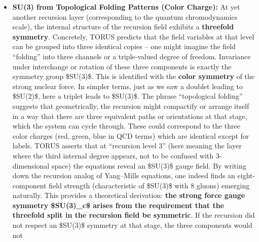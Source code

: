 \documentclass[]{article}
\begin{document}
\begin{itemize}
{  \$U(1)}\{\textbackslash{}text\{em\}\}\$ (electromagnetism), yielding
  three massive gauge bosons (\$W\^{}+, W\^{}-, Z\^{}0\$) and one
  massless photon, exactly as in the electroweak theory​. All of these
  details (like the values of coupling constants and the mixing angle)
  emerge from the recursion structure -- for example, the ratio of how
  the recursion fields split between the two components can determine
  the Weinberg angle of mixing​. The important takeaway is that
  \textbf{TORUS provides a group-theoretic proof that an \$SU(2)\$
  symmetry must exist given a twofold recursion degeneracy} and that
  including a phase symmetry alongside yields the electroweak gauge
  group, which then follows the pattern of symmetry breaking consistent
  with observation.
\item
  \textbf{SU(3) from Topological Folding Patterns (Color Charge):} At
  yet another recursion layer (corresponding to the quantum
  chromodynamics scale), the internal structure of the recursion field
  exhibits a \textbf{threefold symmetry}. Concretely, TORUS predicts
  that the field variables at that level can be grouped into three
  identical copies -- one might imagine the field ``folding'' into three
  channels or a triple-valued degree of freedom​. Invariance under
  interchange or rotation of these three components is exactly the
  symmetry group \$SU(3)\$. This is identified with the \textbf{color
  symmetry} of the strong nuclear force. In simpler terms, just as we
  saw a doublet leading to \$SU(2)\$, here a triplet leads to \$SU(3)\$.
  The phrase ``topological folding'' suggests that geometrically, the
  recursion might compactify or arrange itself in a way that there are
  three equivalent paths or orientations at that stage, which the system
  can cycle through. These could correspond to the three color charges
  (red, green, blue in QCD terms) which are identical except for labels.
  TORUS asserts that at ``recursion level 3'' (here meaning the layer
  where the third internal degree appears, not to be confused with
  3-dimensional space) the equations reveal an \$SU(3)\$ gauge field​.
  By writing down the recursion analog of Yang--Mills equations, one
  indeed finds an eight-component field strength (characteristic of
  \$SU(3)\$ with 8 gluons) emerging naturally​. This provides a
  theoretical derivation: \textbf{the strong force gauge symmetry
  \$SU(3)\_c\$ arises from the requirement that the threefold split in
  the recursion field be symmetric}. If the recursion did not respect an
  \$SU(3)\$ symmetry at that stage, the three components would not

\end{itemize}
\end{document}
